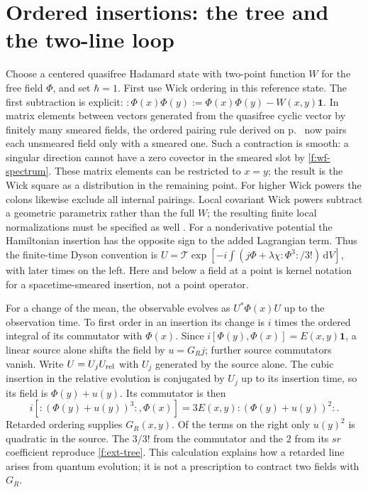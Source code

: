 \section{Ordered insertions: the tree and the two-line loop}
Choose a centered quasifree Hadamard state with two-point function $W$ for
the free field $\Phi$, and set $\hbar=1$. First use Wick ordering in this
reference state. The first subtraction is explicit:
$:\!\Phi(x)\Phi(y)\!:=\Phi(x)\Phi(y)-W(x,y)\mathbf1$.
In matrix elements between vectors generated from the quasifree cyclic
vector by finitely many smeared fields, the ordered pairing rule derived on
p.~\pageref{f:wick-pairings} now pairs each
unsmeared field only with a smeared one. Such a contraction is smooth:
a singular direction cannot have a zero covector in the smeared slot by
\eqref{f:wf-spectrum}. These matrix elements can be restricted to $x=y$;
the result is the Wick square as a distribution in the remaining point.
For higher Wick powers the colons likewise exclude all internal pairings.
Local covariant Wick powers subtract a geometric parametrix rather than
the full $W$; the resulting finite local normalizations must be specified
as well \cite{HWick}.
For a nonderivative potential the Hamiltonian insertion has the opposite
sign to the added Lagrangian term. Thus the finite-time Dyson convention
is $U=\mathcal T\exp[-i\int (j\Phi+\lambda\chi:\!\Phi^3\!:/3!)\,\mathrm{d}V]$,
with later times on the left. Here and below a field at a point is kernel
notation for a spacetime-smeared insertion, not a point operator.

For a change of the mean, the observable evolves as $U^*\Phi(x)U$ up to
the observation time. To first order in an insertion its change is $i$
times the ordered integral of its commutator with $\Phi(x)$. Since
$i[\Phi(y),\Phi(x)]=E(x,y)\mathbf1$, a linear source alone shifts the
field by $u=G_Rj$; further source commutators vanish. Write $U=U_j U_{\rm rel}$
with $U_j$ generated by the source alone. The cubic insertion in the
relative evolution is conjugated by $U_j$ up to its insertion time, so
its field is $\Phi(y)+u(y)$. Its commutator is then
\[
 i[:\!(\Phi(y)+u(y))^3\!:,\Phi(x)]
       =3E(x,y):\!(\Phi(y)+u(y))^2\!: .
\]
Retarded ordering supplies $G_R(x,y)$. Of the terms on the right only
$u(y)^2$ is quadratic in the source. The $3/3!$ from the commutator and
the $2$ from its $sr$ coefficient reproduce \eqref{f:ext-tree}. This
calculation explains how a retarded line arises from quantum evolution;
it is not a prescription to contract two fields with $G_R$.

